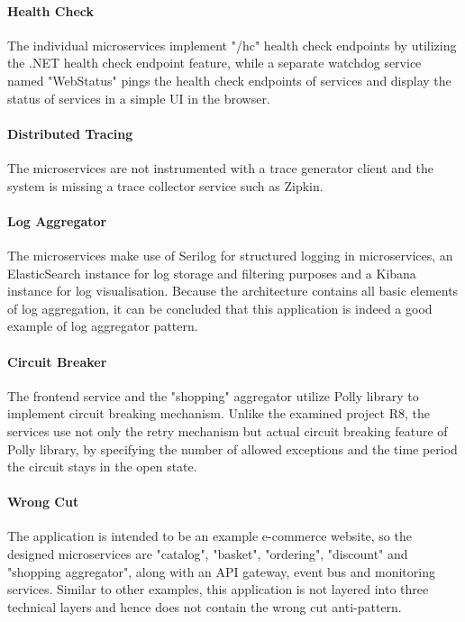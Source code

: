 \documentclass{Configuration_Files/PoliMi3i_thesis}
\begin{document}
\paragraph{Health Check} The individual microservices implement "/hc" health check endpoints by utilizing the .NET health check endpoint feature, while a separate watchdog service named "WebStatus" pings the health check endpoints of services and display the status of services in a simple UI in the browser.

\paragraph{Distributed Tracing} The microservices are not instrumented with a trace generator client and the system is missing a trace collector service such as Zipkin.

\paragraph{Log Aggregator} The microservices make use of Serilog for structured logging in microservices, an ElasticSearch instance for log storage and filtering purposes and a Kibana instance for log visualisation.
Because the architecture contains all basic elements of log aggregation, it can be concluded that this application is indeed a good example of log aggregator pattern.

\paragraph{Circuit Breaker} The frontend service and the "shopping" aggregator utilize Polly library to implement circuit breaking mechanism.
Unlike the examined project R8, the services use not only the retry mechanism but actual circuit breaking feature of Polly library, by specifying the number of allowed exceptions and the time period the circuit stays in the open state.

\paragraph{Wrong Cut} The application is intended to be an example e-commerce website, so the designed microservices are "catalog", "basket", "ordering", "discount" and "shopping aggregator", along with an API gateway, event bus and monitoring services.
Similar to other examples, this application is not layered into three technical layers and hence does not contain the wrong cut anti-pattern.
\end{document}
